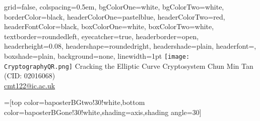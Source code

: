 \documentclass[landscape,final,a0paper]{baposter}
\begin{document}





\newlength{\leftimgwidth}
\begin{poster}%
  {
  grid=false,
  colspacing=0.5em,
  bgColorOne=white,
  bgColorTwo=white,
  borderColor=black,
  headerColorOne=pastelblue,
  headerColorTwo=red,
  headerFontColor=black,
 boxColorOne=white,
 boxColorTwo=white,
  textborder=roundedleft,
  eyecatcher=true,
  headerborder=open,
  headerheight=0.08\textheight,
  headershape=roundedright,
  headershade=plain,
  headerfont=\large, %
  boxshade=plain,
  background=none,
  linewidth=1pt
  }
  {\texttt{[image: CryptographyQR.png]}} %
  { %
  Cracking the Elliptic Curve Cryptosystem} 
  { %
  \vspace{0.5em} 
  Chun Min Tan (CID: 02016068) \\ 
  \url{cmt122@ic.ac.uk}
  }
  { %
  }

  =[top color=baposterBGtwo!30!white,bottom color=baposterBGone!30!white,shading=axis,shading angle=30]

     \setlength{\leftimgwidth}{0.78em+8.0em}


\end{poster}
\end{document}

